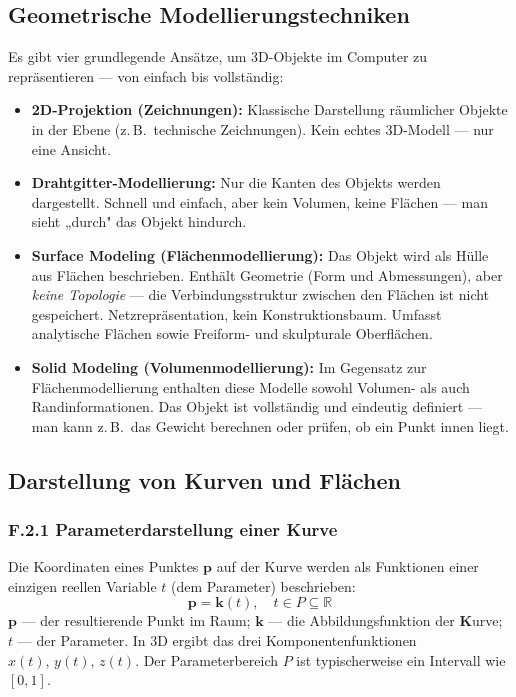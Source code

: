 \documentclass[12pt, a4paper]{article}
\begin{document}
\subsection{Geometrische Modellierungstechniken}

Es gibt vier grundlegende Ansätze, um 3D-Objekte im Computer zu repräsentieren — von einfach bis vollständig:

\begin{itemize}
  \item \textbf{2D-Projektion (Zeichnungen):} Klassische Darstellung räumlicher Objekte in der Ebene (z.\,B.\ technische Zeichnungen). Kein echtes 3D-Modell — nur eine Ansicht.
  \item \textbf{Drahtgitter-Modellierung:} Nur die Kanten des Objekts werden dargestellt. Schnell und einfach, aber kein Volumen, keine Flächen — man sieht „durch" das Objekt hindurch.
  \item \textbf{Surface Modeling (Flächenmodellierung):} Das Objekt wird als Hülle aus Flächen beschrieben. Enthält Geometrie (Form und Abmessungen), aber \textit{keine Topologie} — die Verbindungsstruktur zwischen den Flächen ist nicht gespeichert. Netzrepräsentation, kein Konstruktionsbaum. Umfasst analytische Flächen sowie Freiform- und skulpturale Oberflächen.
  \item \textbf{Solid Modeling (Volumenmodellierung):} Im Gegensatz zur Flächenmodellierung enthalten diese Modelle sowohl Volumen- als auch Randinformationen. Das Objekt ist vollständig und eindeutig definiert — man kann z.\,B.\ das Gewicht berechnen oder prüfen, ob ein Punkt innen liegt.
\end{itemize}

\subsection{Darstellung von Kurven und Flächen}

\subsubsection*{F.2.1 Parameterdarstellung einer Kurve}

Die Koordinaten eines Punktes $\mathbf{p}$ auf der Kurve werden als Funktionen einer einzigen reellen Variable $t$ (dem Parameter) beschrieben:
\[
  \mathbf{p} = \mathbf{k}(t), \quad t \in P \subseteq \mathbb{R}
\]
$\mathbf{p}$ — der resultierende Punkt im Raum; $\mathbf{k}$ — die Abbildungsfunktion der \textbf{K}urve; $t$ — der Parameter. In 3D ergibt das drei Komponentenfunktionen $x(t),\, y(t),\, z(t)$. Der Parameterbereich $P$ ist typischerweise ein Intervall wie $[0,1]$.
\end{document}
